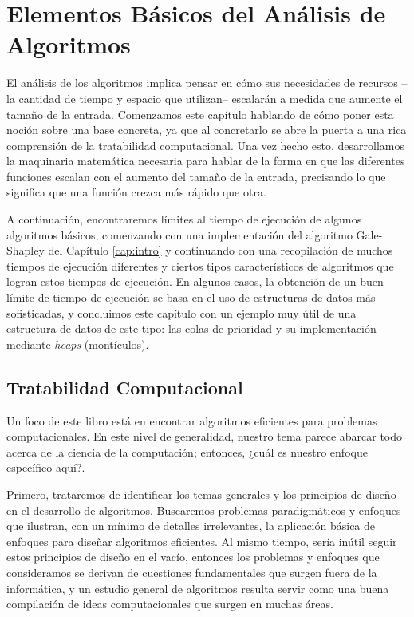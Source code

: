 \documentclass[a4paper, 12pt]{book}
\begin{document}
\chapter{Elementos Básicos del Análisis de Algoritmos}

El análisis de los algoritmos implica pensar en cómo sus necesidades de recursos --la cantidad de tiempo y espacio que utilizan-- escalarán a medida que aumente el tamaño de la entrada. Comenzamos este capítulo hablando de cómo poner esta noción sobre una base concreta, ya que al concretarlo se abre la puerta a una rica comprensión de la tratabilidad computacional. Una vez hecho esto, desarrollamos la maquinaria matemática necesaria para hablar de la forma en que las diferentes funciones escalan con el aumento del tamaño de la entrada, precisando lo que significa que una función crezca más rápido que otra.

A continuación, encontraremos límites al tiempo de ejecución de algunos algoritmos básicos, comenzando con una implementación del algoritmo Gale-Shapley del Capítulo \ref{cap:intro} y continuando con una recopilación de muchos tiempos de ejecución diferentes y ciertos tipos característicos de algoritmos que logran estos tiempos de ejecución. En algunos casos, la obtención de un buen límite de tiempo de ejecución se basa en el uso de estructuras de datos más sofisticadas, y concluimos este capítulo con un ejemplo muy útil de una estructura de datos de este tipo: las colas de prioridad y su implementación mediante \textit{heaps} (montículos).

\section{Tratabilidad Computacional}

Un foco de este libro está en encontrar algoritmos eficientes para problemas computacionales. En este nivel de generalidad, nuestro tema parece abarcar todo acerca de la ciencia de la computación; entonces, ¿cuál es nuestro enfoque específico aquí?. 

Primero, trataremos de identificar los temas generales y los principios de diseño en el desarrollo de algoritmos. Buscaremos problemas paradigmáticos y enfoques que ilustran, con un mínimo de detalles irrelevantes, la aplicación básica de enfoques para diseñar algoritmos eficientes. Al mismo tiempo, sería inútil seguir estos principios de diseño en el vacío, entonces los problemas y enfoques que consideramos se derivan de cuestiones fundamentales que surgen fuera de la informática, y un estudio general de algoritmos resulta servir como una buena compilación de ideas computacionales que surgen en muchas áreas. 
\end{document}
